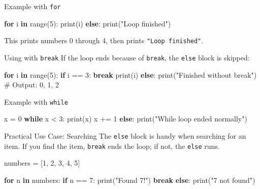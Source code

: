 \documentclass[
  letterpaper,
  DIV=11,
  numbers=noendperiod]{scrreprt}
\newenvironment{Shaded}{\begin{snugshade}}{\end{snugshade}}
\newcommand{\BuiltInTok}[1]{\textcolor[rgb]{0.00,0.23,0.31}{#1}}
\newcommand{\CommentTok}[1]{\textcolor[rgb]{0.37,0.37,0.37}{#1}}
\newcommand{\ControlFlowTok}[1]{\textcolor[rgb]{0.00,0.23,0.31}{\textbf{#1}}}
\newcommand{\DecValTok}[1]{\textcolor[rgb]{0.68,0.00,0.00}{#1}}
\newcommand{\KeywordTok}[1]{\textcolor[rgb]{0.00,0.23,0.31}{\textbf{#1}}}
\newcommand{\NormalTok}[1]{\textcolor[rgb]{0.00,0.23,0.31}{#1}}
\newcommand{\OperatorTok}[1]{\textcolor[rgb]{0.37,0.37,0.37}{#1}}
\newcommand{\StringTok}[1]{\textcolor[rgb]{0.13,0.47,0.30}{#1}}
\begin{document}
Example with \texttt{for}

\begin{Shaded}
\begin{Highlighting}[]
\ControlFlowTok{for}\NormalTok{ i }\KeywordTok{in} \BuiltInTok{range}\NormalTok{(}\DecValTok{5}\NormalTok{):}
    \BuiltInTok{print}\NormalTok{(i)}
\ControlFlowTok{else}\NormalTok{:}
    \BuiltInTok{print}\NormalTok{(}\StringTok{"Loop finished"}\NormalTok{)}
\end{Highlighting}
\end{Shaded}

This prints numbers 0 through 4, then prints \texttt{"Loop\ finished"}.

Using with \texttt{break} If the loop ends because of \texttt{break},
the \texttt{else} block is skipped:

\begin{Shaded}
\begin{Highlighting}[]
\ControlFlowTok{for}\NormalTok{ i }\KeywordTok{in} \BuiltInTok{range}\NormalTok{(}\DecValTok{5}\NormalTok{):}
    \ControlFlowTok{if}\NormalTok{ i }\OperatorTok{==} \DecValTok{3}\NormalTok{:}
        \ControlFlowTok{break}
    \BuiltInTok{print}\NormalTok{(i)}
\ControlFlowTok{else}\NormalTok{:}
    \BuiltInTok{print}\NormalTok{(}\StringTok{"Finished without break"}\NormalTok{)}
\CommentTok{\# Output: 0, 1, 2}
\end{Highlighting}
\end{Shaded}

Example with \texttt{while}

\begin{Shaded}
\begin{Highlighting}[]
\NormalTok{x }\OperatorTok{=} \DecValTok{0}
\ControlFlowTok{while}\NormalTok{ x }\OperatorTok{\textless{}} \DecValTok{3}\NormalTok{:}
    \BuiltInTok{print}\NormalTok{(x)}
\NormalTok{    x }\OperatorTok{+=} \DecValTok{1}
\ControlFlowTok{else}\NormalTok{:}
    \BuiltInTok{print}\NormalTok{(}\StringTok{"While loop ended normally"}\NormalTok{)}
\end{Highlighting}
\end{Shaded}

Practical Use Case: Searching The \texttt{else} block is handy when
searching for an item. If you find the item, \texttt{break} ends the
loop; if not, the \texttt{else} runs.

\begin{Shaded}
\begin{Highlighting}[]
\NormalTok{numbers }\OperatorTok{=}\NormalTok{ [}\DecValTok{1}\NormalTok{, }\DecValTok{2}\NormalTok{, }\DecValTok{3}\NormalTok{, }\DecValTok{4}\NormalTok{, }\DecValTok{5}\NormalTok{]}

\ControlFlowTok{for}\NormalTok{ n }\KeywordTok{in}\NormalTok{ numbers:}
    \ControlFlowTok{if}\NormalTok{ n }\OperatorTok{==} \DecValTok{7}\NormalTok{:}
        \BuiltInTok{print}\NormalTok{(}\StringTok{"Found 7!"}\NormalTok{)}
        \ControlFlowTok{break}
\ControlFlowTok{else}\NormalTok{:}
    \BuiltInTok{print}\NormalTok{(}\StringTok{"7 not found"}\NormalTok{)}
\end{Highlighting}
\end{Shaded}
\end{document}
